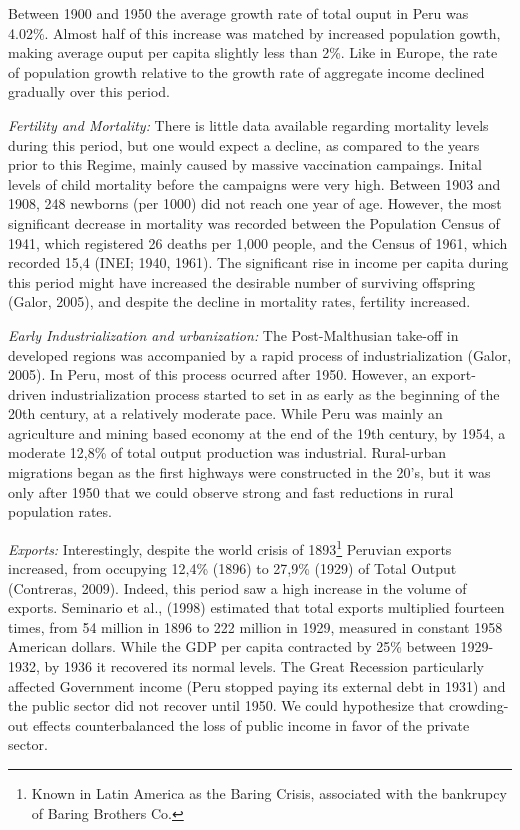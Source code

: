 \documentclass[12pt]{article}%
\begin{document}
Between 1900 and 1950 the average growth rate of total ouput in Peru was 4.02\%. Almost half of this increase was matched by increased population gowth, making average ouput per capita slightly less than 2\%. Like in Europe, the rate of population growth relative to the growth rate of aggregate income declined gradually over this period.

\emph{Fertility and Mortality:} There is little data available regarding mortality levels during this period, but one would expect a decline, as compared to the years prior to this Regime, mainly caused by massive vaccination campaings. Inital levels of child mortality before the campaigns were very high. Between 1903 and 1908, 248 newborns (per 1000) did not reach one year of age. However, the most significant decrease in mortality was recorded between the Population Census of 1941, which registered 26 deaths per 1,000 people, and the Census of 1961, which recorded 15,4 (INEI; 1940, 1961). The significant rise in income per capita during this period might have increased the desirable number of surviving offspring (Galor, 2005), and despite the decline in mortality rates, fertility increased.

\emph{Early Industrialization and urbanization:} The Post-Malthusian take-off in developed regions was accompanied by a rapid process of industrialization (Galor, 2005). In Peru, most of this process ocurred after 1950. However, an export-driven industrialization process started to set in as early as the beginning of the 20th century, at a relatively moderate pace. While Peru was mainly an agriculture and mining based economy at the end of the 19th century, by 1954, a moderate 12,8\% of total output production was industrial. Rural-urban migrations began as the first highways were constructed in the 20's, but it was only after 1950 that we could observe strong and fast reductions in rural population rates.

\emph{Exports:} Interestingly, despite the world crisis of 1893\footnote{Known in Latin America as the Baring Crisis, associated with the bankrupcy of Baring Brothers Co.} Peruvian exports increased, from occupying 12,4\% (1896) to 27,9\% (1929) of Total Output (Contreras, 2009). Indeed, this period saw a high increase in the volume of exports. Seminario et al., (1998) estimated that total exports multiplied fourteen times, from 54 million in 1896 to 222 million in 1929, measured in constant 1958 American dollars. While the GDP per capita contracted by 25\% between 1929-1932, by 1936 it recovered its normal levels. The Great Recession particularly affected Government income (Peru stopped paying its external debt in 1931) and the public sector did not recover until 1950. We could hypothesize that crowding-out effects counterbalanced the loss of public income in favor of the private sector.
\end{document}
